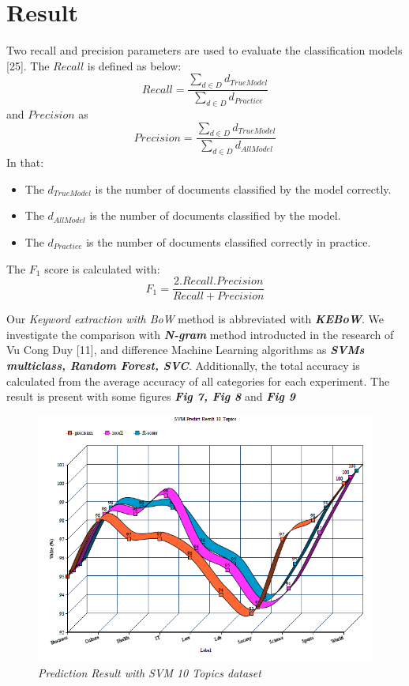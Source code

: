 \documentclass[conference]{IEEEtran}
\begin{document}
\section{Result}
Two recall and precision parameters are used to evaluate the classification models [25]. The $Recall$ is defined as below:
\[Recall=\frac{\sum_{d\in D}d_{TrueModel}}{\sum_{d\in D}d_{Practice}}\]
and $Precision$ as
\[Precision=\frac{\sum_{d\in D}d_{TrueModel}}{\sum_{d\in D}d_{AllModel}}\]
In that:
\begin{itemize}
  \item The $d_{TrueModel}$ is the number of documents classified by the model correctly.
  \item The $d_{AllModel}$ is the number of documents classified by the model.
  \item The $d_{Practice}$ is the number of documents classified correctly in practice.
\end{itemize}
The $F_1$ score is calculated with:
\[F_1=\frac{2.Recall.Precision}{Recall + Precision}\]

Our \textit{Keyword extraction with BoW} method is abbreviated with \textit{\textbf{KEBoW}}. We investigate the comparison with \textit{\textbf{N-gram}} method introducted in the research of Vu Cong Duy [11], and difference Machine Learning algorithms as \textit{\textbf{SVMs multiclass, Random Forest, SVC}}. Additionally, the total accuracy is calculated from the average accuracy of all categories for each experiment. The result is present with some figures \textit{\textbf{Fig 7, Fig 8}} and \textit{\textbf{Fig 9}}

\begin{figure}[h]
\includegraphics[scale=0.45]{svm_predict.png}
\centering
\caption{\textit{Prediction Result with SVM 10 Topics dataset}}
\end{figure}
\end{document}
